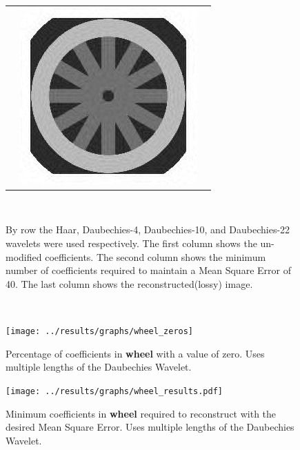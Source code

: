 \begin{figure}[hbt]
\begin{tabular}{ S @{} S @{} S }
		&	\includegraphics[height=0.25\textwidth]{../images/wheel_d22_final} \\
	\end{tabular} \\
	\caption{By row the Haar, Daubechies-4, Daubechies-10, and Daubechies-22 wavelets were used 
					 respectively. The first
					 column shows the un-modified coefficients.  The second column shows the minimum number
					 of coefficients required to maintain a Mean Square Error of 40.
					 The last column shows the reconstructed(lossy) image.}
\end{figure}

~\vfill
\FloatBarrier

\begin{figure}[hbt]
	\centering
	\label{fig:wheel_zeros}
		\texttt{[image: ../results/graphs/wheel\_zeros]}
	\caption{Percentage of coefficients in {\bf wheel} with a value of zero. Uses multiple lengths of the Daubechies Wavelet. }
\end{figure}
\begin{figure}[hbt]
	\centering
	\label{fig:wheel_stats}
		\texttt{[image: ../results/graphs/wheel\_results.pdf]}
	\caption{Minimum coefficients in {\bf wheel} required to reconstruct with the desired Mean Square Error. Uses multiple lengths of the Daubechies Wavelet. }
\end{figure}

\vfill

